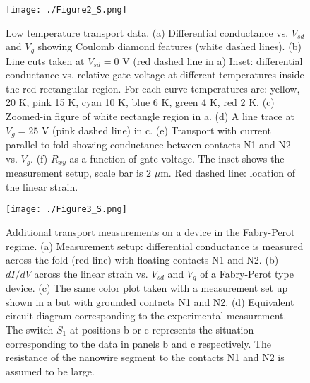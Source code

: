 \documentclass[journal=jacsat,manuscript=article]{achemso}
\begin{document}
\newpage
\begin{figure}
\begin{center}
\texttt{[image: ./Figure2\_S.png]}
\end{center}
\caption{{Low temperature transport data.} ({a}) Differential conductance vs. $V_{sd}$ and $V_{g}$ showing Coulomb diamond features (white dashed lines). ({b}) Line cuts taken at $V_{sd}=0$ V (red dashed line in {a}) Inset: differential conductance vs. relative gate voltage at different temperatures inside the red rectangular region. For each curve temperatures are: yellow, 20 K, pink 15 K, cyan 10 K, blue 6 K, green 4 K, red 2 K. ({c}) Zoomed-in figure of white rectangle region in {a}. ({d}) A line trace at $V_{g}=25$ V (pink dashed line) in {c}. ({e}) Transport with current parallel to fold showing conductance between contacts N1 and N2 vs. $V_g$. ({f}) $R_{xy}$ as a function of gate voltage. The inset shows the measurement setup, scale bar is $2$ $\mu$m. Red dashed line: location of the linear strain.}
\label{2}

\end{figure}


\begin{figure}
\begin{center}
\texttt{[image: ./Figure3\_S.png]}
\end{center}
\caption{{ Additional transport measurements on a device in the Fabry-Perot regime.}  ({a}) Measurement setup: differential conductance is measured across the fold (red line) with floating contacts N1 and N2.  ({b}) $dI/dV$ across the linear strain vs. $V_{sd}$ and $V_g$ of a Fabry-Perot type device. ({c}) The same color plot taken with a measurement set up shown in {a} but with grounded contacts N1 and N2. ({d}) Equivalent circuit diagram corresponding to the experimental measurement. The switch $S_1$ at positions {b} or {c} represents the situation corresponding to the data in panels {b} and {c} respectively. The resistance of the nanowire segment to the contacts N1 and N2 is assumed to be large.}
\label{3}
\end{figure}
\end{document}
